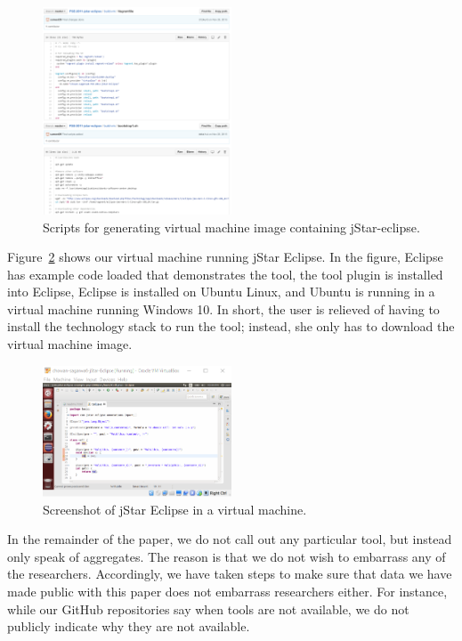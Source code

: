 \documentclass[10pt,conference]{IEEEtran}
\begin{document}
\begin{figure}[t]
  \centering
    \includegraphics[width=0.5\textwidth]{vagrant.png}
  \caption{Scripts for generating virtual machine image containing jStar-eclipse.}\label{fig:vagrant}
\end{figure}

Figure~\ref{fig:vm} shows our virtual machine running 
jStar Eclipse.
In the figure, 
Eclipse has example code loaded that demonstrates
the tool, 
the tool plugin is installed into Eclipse,
Eclipse is installed on Ubuntu Linux,
and Ubuntu is running in a virtual machine
running Windows 10. 
In short, the user is relieved of having to install
the technology stack to run the tool; instead, 
she only has to download the virtual machine image.

\begin{figure}[t]
  \centering
    \includegraphics[width=0.5\textwidth]{vm.png}
  \caption{Screenshot of jStar Eclipse in a virtual machine.}\label{fig:vm}
\end{figure}

In the remainder of the paper, we do not call out 
any particular tool, but instead only speak of aggregates.
The reason is that we do not wish to embarrass any of the researchers.
Accordingly, we have taken steps to make sure that data we have made 
public with this paper does not embarrass researchers either.
For instance, while our GitHub repositories say when tools are 
not available, we do not publicly indicate why they are
not available.
\end{document}
